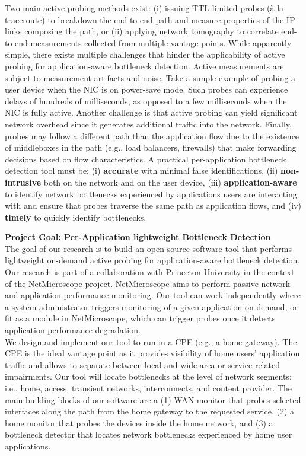 \documentclass[11 pt]{article}
\begin{document}
Two main active probing methods exist: (i) issuing TTL-limited probes (\`{a} la traceroute) to breakdown the end-to-end path and measure properties of the IP links composing the path, or (ii) applying network tomography to correlate end-to-end measurements collected from multiple vantage points. While apparently simple, there exists multiple challenges that hinder the applicability of active probing for application-aware bottleneck detection. Active measurements are subject to measurement artifacts and noise. Take a simple example of probing a user device when the NIC is on power-save mode. Such probes can experience delays of hundreds of milliseconds, as opposed to a few milliseconds when the NIC is fully active. Another challenge is that active probing can yield significant network overhead since it generates additional traffic into the network. Finally, probes may follow a different path than the application flow due to the existence of middleboxes in the path (e.g., load balancers, firewalls) that make forwarding decisions based on flow characteristics. A practical per-application bottleneck detection tool must be: (i) \textbf{accurate} with minimal false identifications, (ii) \textbf{non-intrusive} both on the network and on the user device, (iii) \textbf{application-aware} to identify network bottlenecks experienced by applications users are interacting with and ensure that probes traverse the same path as application flows, and (iv) \textbf{timely} to quickly identify bottlenecks.\\
\newpage

\noindent \textbf{Project Goal: Per-Application lightweight Bottleneck Detection}\\

The goal of our research is to build an open-source software tool that performs lightweight on-demand active probing for application-aware bottleneck detection. Our research is part of a collaboration with Princeton University in the context of the NetMicroscope project. NetMicroscope aims to perform passive network and application performance monitoring. Our tool can work independently where a system administrator triggers monitoring of a given application on-demand; or fit as a module in NetMicroscope, which can trigger probes once it detects application performance degradation.\\

We design and implement our tool to run in a CPE (e.g., a home gateway). The CPE is the ideal vantage point as it provides visibility of home users' application traffic and allows to separate between local and wide-area or service-related impairments. Our tool will locate bottlenecks at the level of network segments: i.e., home, access, transient networks, interconnects, and content provider. The main building blocks of our software are a (1) WAN monitor that probes selected interfaces along the path from the home gateway to the requested service, (2) a home monitor that probes the devices inside the home network, and (3) a bottleneck detector that locates network bottlenecks experienced by home user applications.\\
\end{document}
